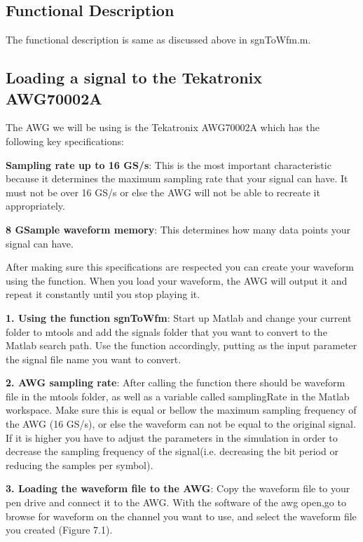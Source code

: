 \subsection*{Functional Description}
The functional description is same as discussed above in sgnToWfm.m.

\subsection{Loading a signal to the Tekatronix AWG70002A}

The AWG we will be using is the Tekatronix AWG70002A which has the following key specifications:
\bigskip

\textbf{Sampling rate up to 16 GS/s}: This is the most important characteristic  because it determines the maximum sampling rate that your signal can have. It must not be over 16 GS/s or else the AWG will not be able to recreate it appropriately.
\bigskip

\textbf{8 GSample waveform memory}: This determines how many data points your signal can have.
\bigskip

After making sure this specifications are respected you can create your waveform using the function. When you load your waveform, the AWG will output it and repeat it constantly until you stop playing it.
\bigskip

\textbf{1. Using the function sgnToWfm}:
Start up Matlab and change your current folder to mtools and add the signals folder that you want to convert to the Matlab search path. Use the function accordingly, putting as the input parameter the signal file name you want to convert.
\bigskip

\noindent
\textbf{2. AWG sampling rate}:
After calling the function there should be waveform file in the mtools folder, as well as a variable called samplingRate in the Matlab workspace. Make sure this is equal or bellow the maximum sampling frequency of the AWG (16 GS/s), or else the waveform can not be equal to the original signal. If it is higher you  have to adjust the parameters in the simulation in order to decrease the sampling frequency of the signal(i.e. decreasing the bit period or reducing the samples per symbol).
\bigskip

\noindent
\textbf{3. Loading the waveform file to the AWG}:
Copy the waveform file to your pen drive and connect it to the AWG. With the software of the awg open,go to browse for waveform on the channel you want to use, and select the waveform file you created (Figure 7.1).

